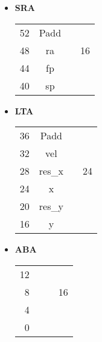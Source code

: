 \documentclass[a4paper,10pt]{article}
\begin{document}
\begin{itemize}


\begin{center}
\begin{tabular}{ r | p{1cm} | c | l }
  \cline{2-2}              
   & & & \\        
   & SRA & & \\ 
   & & & \\ \cline{2-2}
   & & & \\ 
   & LTA & &  56 \\ 
   & & & \\ \cline{2-2}
   & & & \\ 
   & ABA & &\\
   & & & \\ 
  \cline{2-2}
\end{tabular}
\end{center}


\item \textbf{SRA}
\begin{center}
\begin{tabular}{ r | c | c | l }
  \cline{2-2}                       
  52 & Padd& & \\ \cline{2-2}
  48 & ra & &  16 \\ \cline{2-2}
  44 & fp& & \\ \cline{2-2}
  40 & sp & &\\
  \cline{2-2}
\end{tabular}
\end{center}

\item \textbf{LTA}
\begin{center}
\begin{tabular}{ r | c | c | l }
  \cline{2-2}                       
  36 &Padd& & \\ \cline{2-2}
  32 & vel & &   \\ \cline{2-2}
  28 & res\_x & & 24 \\ \cline{2-2}
  24 & x & &\\ \cline{2-2}
  20 & res\_y & & \\ \cline{2-2}
  16 & y & &\\
  \cline{2-2}
\end{tabular}
\end{center}

\item \textbf{ABA}
\begin{center}
\begin{tabular}{ r | p{1cm} | c | l }
  \cline{2-2}                       
  12 &  & & \\ \cline{2-2}
  8 &   & &  16 \\ \cline{2-2}
  4 &  & & \\ \cline{2-2}
  0 &   & &\\
  \cline{2-2}
\end{tabular}
\end{center}


\end{itemize}
\end{document}
